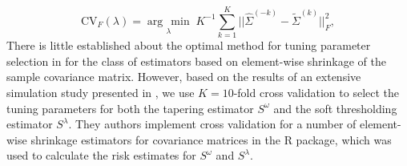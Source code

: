 \documentclass[12pt]{article}
\newcommand{\argmin}[1]{\underset{#1}{\operatorname{arg}\,\operatorname{min}}\;}
\theoremstyle{definition}
\begin{document}
\begin{equation} \label{eq:K-fold-matrix--cv}
\mbox{CV}_F\left(\lambda \right) = \argmin{\lambda} K^{-1} \sum_{k = 1}^K  \vert \vert\hat{\Sigma}^{\left(-k\right)} - \tilde{\Sigma}^{\left(k\right)}  \vert \vert_F^2, 
\end{equation}
\noindent
%
There is little established about the optimal method for tuning parameter selection in for the class of estimators based on element-wise shrinkage of the sample covariance matrix.  However, based on the results of an extensive simulation study presented in \citet{fang2016tuning}, we use $K = 10$-fold cross validation to select the tuning parameters for both the tapering estimator $S^\omega$ and the soft thresholding estimator $S^{\lambda}$. They authors implement cross validation for a number of element-wise shrinkage estimators for covariance matrices in the \citet{CVTuningCov} R package, which was used to calculate the risk estimates for $S^{\omega}$ and $S^{\lambda}$. 

\bigskip
\end{document}
